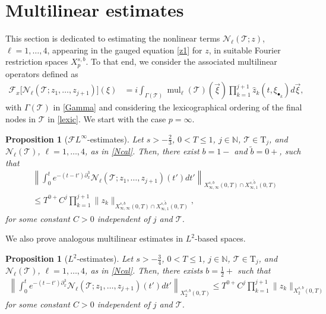 \documentclass[a4paper,
11pt,  reqno]{amsart}
\newcommand{\5}{\textup{V}}
\newcommand{\noi}{\noindent}
\newcommand{\FL}{\mathcal{F} L}
\newcommand{\ft}{\widehat}
\newcommand{\wt}{\widetilde}
\newcommand{\dx}{\partial_x}
\newtheorem{proposition}[theorem]{Proposition}
\theoremstyle{remark}
\newcommand{\bul}{\bullet}
\newcommand{\TT}{\mathcal{T}}
\newcommand{\Tr}{\mathrm{T}}
\newcommand{\G}{\Gamma}
\newcommand{\Ft}{{\mathcal{F}}}
\renewcommand{\l}{\ell}
\newcommand{\N}{\mathbb{N}}
\DeclareMathOperator{\mul}{mul}
\numberwithin{equation}{section}
\numberwithin{theorem}{section}
\newcommand{\Ncal}{\mathcal{N}}
\begin{document}
\section{Multilinear estimates}\label{sec:multi}


This section is dedicated to 
estimating the nonlinear terms $\Ncal_\l(\TT;z)$, $\l=1, \ldots, 4$,  appearing in the gauged equation \eqref{z1} for $z$, in suitable Fourier restriction spaces $X^{s, b}_{p}$.
To that end, we consider the associated multilinear operators defined as
\begin{align}
\label{Ncal}
    \Ft_x\big[ \Ncal_\l (\TT; z_1, \ldots, z_{j+1} ) \big](\xi) 
    &
    = 
    i \int_{\G(\TT)} \mul_\l(\TT)(\vec\xi) \prod_{k=1}^{j+1} \ft{z}_k(t, \xi_{\bul_k}) d\vec\xi,
\end{align}
with $\G(\TT)$ in \eqref{Gamma} and considering the lexicographical ordering of the final nodes in $\TT$ in \eqref{lexic}. 
We start with the case $p=\infty$.




\begin{proposition}[$\FL^\infty$-estimates]\label{prop:bourgLinfty}
Let $s>-\frac23$, $0< T \le 1$, $j \in\N$, $\TT \in \Tr_j$, and $\Ncal_\l(\TT)$, $\l=1,\dots, 4$, as in \eqref{Ncal}. Then, there exist 
$b=1-$ and $\wt{b}=0+$, such that
	\begin{multline}
		\left\| \int_0^t e^{-(t-t')\dx^3}\Ncal_\l(\TT; z_1,\dots, z_{j+1})(t')dt'\right\|_{X^{s,b}_{\infty, \infty} (0,T)\cap X^{s,\wt b}_{\infty, 1}(0,T)}
        \\
        \le T^{0+} C^j\prod_{k=1}^{j+1}\|z_k\|_{X^{s,b}_{\infty, \infty} (0,T) \cap X^{s,\wt{b}}_{\infty,1}(0,T)}, \label{eq:Linftybourg1} 
	\end{multline}
for some constant $C>0$ independent of $j$ and $\TT$. 
\end{proposition}

\noi We also prove analogous multilinear estimates in $L^2$-based spaces.
\begin{proposition}[$L^2$-estimates]\label{prop:bourgL2}
Let $s>-\frac34$, $0< T \le1$, $j \in\N$, $\TT \in \Tr_j$, and $\Ncal_\l(\TT)$, $\l=1,\dots,4$, as in \eqref{Ncal}.
	Then, there exists $b=\frac12+$ such that
	\begin{align}\label{eq:bourg_bi_l2}
		\left\|\int_0^t e^{-(t-t')\dx^3} \Ncal_\l(\TT; z_1,\dots, z_{j+1})(t') dt'  \right\|_{X^{s,b}_{2}(0,T)}  \le T^{0+} C^j\prod_{k=1}^{j+1}\|z_k\|_{X^{s,b}_{2} (0,T)}
	\end{align}
    for some constant $C>0$ independent of $j$ and $\TT$.
\end{proposition}
\end{document}
